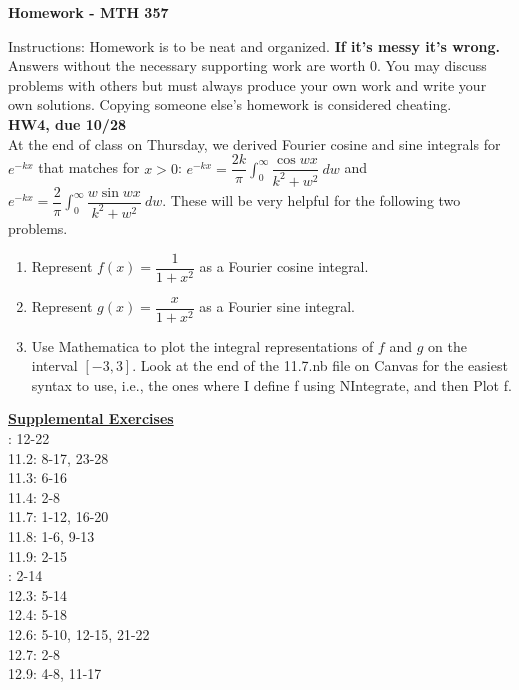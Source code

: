 \documentclass[10pt]{article}
\begin{document}
\begin{center}
{\Large\bf  Homework - MTH 357}\\
\vspace{.1in}


\end{center}

\noindent Instructions:  
Homework is to be neat and organized.  \textbf{If it's messy it's wrong.} Answers without the necessary supporting work are worth 0.   You may discuss problems with others but must always produce your own work and write your own solutions.  Copying someone else's homework is considered cheating.\\

\noindent \textbf{HW4, due 10/28}\\
At the end of class on Thursday, we derived Fourier cosine and sine integrals for $e^{-kx}$ that matches for $x>0$: $e^{-kx}=\dfrac{2k}{\pi}\displaystyle\int_0^\infty \dfrac{\cos{wx}}{k^2+w^2}\ dw$ and $e^{-kx}=\dfrac{2}{\pi}\displaystyle\int_0^\infty \dfrac{w\sin{wx}}{k^2+w^2}\ dw$. These will be very helpful for the following two problems.
\begin{enumerate}
\item Represent $f(x)=\dfrac{1}{1+x^2}$ as a Fourier cosine integral.
\item Represent $g(x)=\dfrac{x}{1+x^2}$ as a Fourier sine integral.
\item Use Mathematica to plot the integral representations of $f$ and $g$ on the interval $[-3,3]$. Look at the end of the 11.7.nb file on Canvas for the easiest syntax to use, i.e., the ones where I define f using NIntegrate, and then Plot f.
\end{enumerate}

\vspace{.5in}
\noindent \underline{\textbf{Supplemental Exercises}}\\


: 12-22\\
11.2: 8-17, 23-28\\
11.3: 6-16\\
11.4: 2-8\\
11.7: 1-12, 16-20\\
11.8: 1-6, 9-13\\
11.9: 2-15\\

: 2-14\\
12.3: 5-14\\
12.4: 5-18\\
12.6: 5-10, 12-15, 21-22\\
12.7: 2-8\\
12.9: 4-8, 11-17\\
\end{document}
